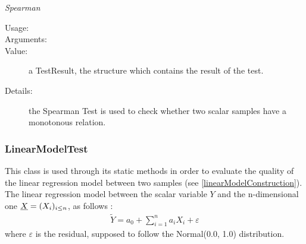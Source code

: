 \begin{description}
\begin{description}
\item \textit{Spearman}
\begin{description}
\item[Usage:] \rule{0pt}{1em}
\item[Arguments:] \rule{0pt}{1em}
\item[Value:]  a TestResult, the structure which contains the result of the test.
\item[Details:] the Spearman Test is used to check whether two scalar samples have a monotonous relation.
\end{description}

\end{description}

\end{description}





\newpage
\subsubsection{LinearModelTest}

This class is used through its static methods in order to evaluate the quality of the linear regression model between two samples (see \ref{linearModelConstruction}).
The linear regression model between the scalar variable $Y$ and the n-dimensional one ${\underline{X}} = (X_i)_{i \leq n}$, as follows :
\begin{align*}
\tilde{Y} = a_0 + \sum_{i=1}^n a_i X_i + \varepsilon
\end{align*}
where $\varepsilon$ is the residual, supposed to follow the Normal(0.0, 1.0) distribution.\\


